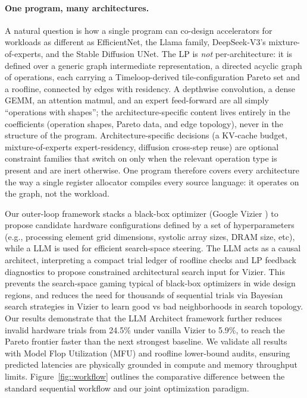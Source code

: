 \paragraph{One program, many architectures.} A natural question is how a single program can co-design accelerators for workloads as different as EfficientNet, the Llama family, DeepSeek-V3's mixture-of-experts, and the Stable Diffusion UNet. The LP is \emph{not} per-architecture: it is defined over a generic graph intermediate representation, a directed acyclic graph of operations, each carrying a Timeloop-derived tile-configuration Pareto set and a roofline, connected by edges with residency. A depthwise convolution, a dense GEMM, an attention matmul, and an expert feed-forward are all simply ``operations with shapes''; the architecture-specific content lives entirely in the coefficients (operation shapes, Pareto data, and edge topology), never in the structure of the program. Architecture-specific decisions (a KV-cache budget, mixture-of-experts expert-residency, diffusion cross-step reuse) are optional constraint families that switch on only when the relevant operation type is present and are inert otherwise. One program therefore covers every architecture the way a single register allocator compiles every source language: it operates on the graph, not the workload.

Our outer-loop framework stacks a black-box optimizer (Google Vizier \citep{google_vizier}) to propose candidate hardware configurations defined by a set of hyperparameters (e.g., processing element grid dimensions, systolic array sizes, DRAM size, etc), while a LLM is used for efficient search-space steering. The LLM acts as a causal architect, interpreting a compact trial ledger of roofline checks and LP feedback diagnostics to propose constrained architectural search input for Vizier. This prevents the search-space gaming typical of black-box optimizers in wide design regions, and reduces the need for thousands of sequential trials via Bayesian search strategies in Vizier to learn good vs bad neighborhoods in search topology. Our results demonstrate that the LLM Architect framework further reduces invalid hardware trials from 24.5\% under vanilla Vizier to 5.9\%, to reach the Pareto frontier faster than the next strongest baseline. We validate all results with Model Flop Utilization (MFU) and roofline lower-bound audits, ensuring predicted latencies are physically grounded in compute and memory throughput limits. Figure~\ref{fig::workflow} outlines the comparative difference between the standard sequential workflow and our joint optimization paradigm. 
